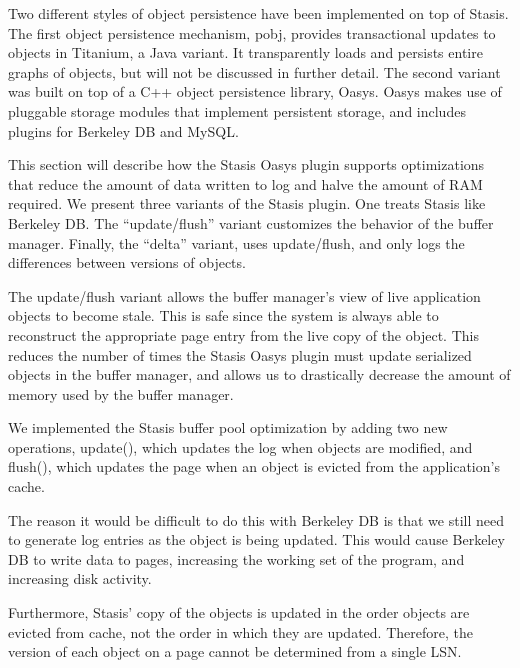 \documentclass[letterpaper,twocolumn,10pt]{article}
\newcommand{\yad}{Stasis\xspace}
\newcommand{\yads}{Stasis'\xspace}
\newcommand{\oasys}{Oasys\xspace}
\begin{document}
Two different styles of object persistence have been implemented
on top of \yad.
%
The first object persistence mechanism, pobj, provides transactional updates to objects in
Titanium, a Java variant.  It transparently loads and persists
entire graphs of objects, but will not be discussed in further detail.
The second variant was built on top of a C++ object
persistence library, \oasys.  \oasys makes use of pluggable storage
modules that implement persistent storage, and includes plugins
for Berkeley DB and MySQL.  

This section will describe how the \yad \oasys plugin supports optimizations that reduce the
amount of data written to log and halve the amount of RAM required.
We present three variants of the \yad plugin.  One treats
\yad like Berkeley DB.  The ``update/flush'' variant
customizes the behavior of the buffer manager. Finally, the 
``delta'' variant, uses update/flush, and only logs the differences
between versions of objects.

The update/flush variant allows the buffer manager's view of live
application objects to become stale.  This is safe since the system is
always able to reconstruct the appropriate page entry from the live
copy of the object.  This reduces the number of times the \yad \oasys
plugin must update serialized objects in the buffer manager, and
allows us to drastically decrease the amount of memory used by the
buffer manager.  

We implemented the \yad buffer pool optimization by adding two new
operations, update(), which updates the log when objects are modified, and flush(), which
updates the page when an object is evicted from the application's cache.  

The reason it would be difficult to do this with Berkeley DB is that
we still need to generate log entries as the object is being updated.
  This would cause Berkeley DB to write data to pages,
increasing the working set of the program, and increasing disk
activity.

Furthermore, \yads copy of the objects is updated in the order objects
are evicted from cache, not the order in which they are updated.
Therefore, the version of each object on a page cannot be determined
from a single LSN.
\end{document}
